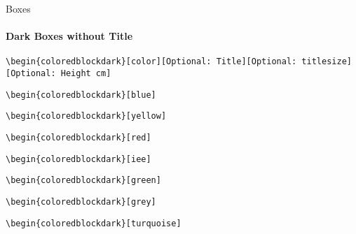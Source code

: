 \documentclass[aspectratio=169]{beamer}
\begin{document}
\begin{frame}{Boxes}
    \framesubtitle{Dark Boxes without Title}

    \footnotesize\centering\texttt{\textbackslash begin\{coloredblockdark\}[color][Optional:~Title][Optional:~titlesize][Optional:~Height cm]}
    
    \begin{minipage}[t]{0.49\textwidth}

        \begin{coloredblockdark}[blue]
            \texttt{\textbackslash begin\{coloredblockdark\}[blue]}\strut
        \end{coloredblockdark}

        \begin{coloredblockdark}[yellow]
            \texttt{\textbackslash begin\{coloredblockdark\}[yellow]}\strut
        \end{coloredblockdark}

        \begin{coloredblockdark}[red]
            \texttt{\textbackslash begin\{coloredblockdark\}[red]}\strut
        \end{coloredblockdark}

    \end{minipage}
    \hfill
    \begin{minipage}[t]{0.49\textwidth}
        
        \begin{coloredblockdark}[iee]
            \texttt{\textbackslash begin\{coloredblockdark\}[iee]}\strut
        \end{coloredblockdark}

        \begin{coloredblockdark}[green]
            \texttt{\textbackslash begin\{coloredblockdark\}[green]}\strut
        \end{coloredblockdark}

        \begin{coloredblockdark}[grey]
            \texttt{\textbackslash begin\{coloredblockdark\}[grey]}\strut
        \end{coloredblockdark}
        
    \end{minipage}

    \centering
    \begin{minipage}[t]{0.49\textwidth}
        \begin{coloredblockdark}[turquoise]
                \texttt{\textbackslash begin\{coloredblockdark\}[turquoise]}\strut
        \end{coloredblockdark}
        
    \end{minipage}
\end{frame}
\end{document}
